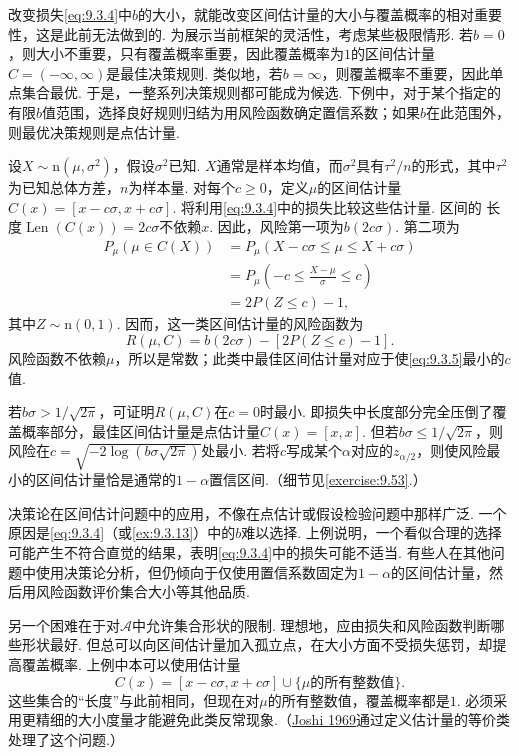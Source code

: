 改变损失\eqref{eq:9.3.4}中$b$的大小，就能改变区间估计量的大小与覆盖概率的相对重要性，这是此前无法做到的. 为展示当前框架的灵活性，考虑某些极限情形. 若$b=0$，则大小不重要，只有覆盖概率重要，因此覆盖概率为$1$的区间估计量$C=(-\infty,\infty)$是最佳决策规则. 类似地，若$b=\infty$，则覆盖概率不重要，因此单点集合最优. 于是，一整系列决策规则都可能成为候选. 下例中，对于某个指定的有限$b$值范围，选择良好规则归结为用风险函数确定置信系数；如果$b$在此范围外，则最优决策规则是点估计量.
\begin{example}[正态区间估计量]\label{ex:9.3.13}
设$X\sim\mathrm n(\mu,\sigma^2)$，假设$\sigma^2$已知. $X$通常是样本均值，而$\sigma^2$具有$\tau^2/n$的形式，其中$\tau^2$为已知总体方差，$n$为样本量. 对每个$c\ge0$，定义$\mu$的区间估计量$C(x)=[x-c\sigma,x+c\sigma]$. 将利用\eqref{eq:9.3.4}中的损失比较这些估计量. 区间的
长度$\operatorname{Len}(C(x))=2c\sigma$不依赖$x$. 因此，风险第一项为$b(2c\sigma)$. 第二项为
$$\begin{aligned}
P_\mu(\mu\in C(X))&=P_\mu(X-c\sigma\le\mu\le X+c\sigma)\\
&=P_\mu\left(-c\le\frac{X-\mu}\sigma\le c\right)\\
&=2P(Z\le c)-1,
\end{aligned}$$
其中$Z\sim\mathrm n(0,1)$. 因而，这一类区间估计量的风险函数为
\begin{equation}\label{eq:9.3.5}
R(\mu,C)=b(2c\sigma)-[2P(Z\le c)-1].
\end{equation}
风险函数不依赖$\mu$，所以是常数；此类中最佳区间估计量对应于使\eqref{eq:9.3.5}最小的$c$值.

若$b\sigma>1/\sqrt{2\pi}$，可证明$R(\mu,C)$在$c=0$时最小. 即损失中长度部分完全压倒了覆盖概率部分，最佳区间估计量是点估计量$C(x)=[x,x]$. 但若$b\sigma\le1/\sqrt{2\pi}$，则风险在$c=\sqrt{-2\log(b\sigma\sqrt{2\pi})}$处最小. 若将$c$写成某个$\alpha$对应的$z_{\alpha/2}$，则使风险最小的区间估计量恰是通常的$1-\alpha$置信区间.（细节见\autoref{exercise:9.53}.）
\end{example}
决策论在区间估计问题中的应用，不像在点估计或假设检验问题中那样广泛. 一个原因是\eqref{eq:9.3.4}（或\autoref{ex:9.3.13}）中的$b$难以选择. 上例说明，一个看似合理的选择可能产生不符合直觉的结果，表明\eqref{eq:9.3.4}中的损失可能不适当. 有些人在其他问题中使用决策论分析，但仍倾向于仅使用置信系数固定为$1-\alpha$的区间估计量，然后用风险函数评价集合大小等其他品质.

另一个困难在于对$\mathcal A$中允许集合形状的限制. 理想地，应由损失和风险函数判断哪些形状最好. 但总可以向区间估计量加入孤立点，在大小方面不受损失惩罚，却提高覆盖概率. 上例中本可以使用估计量
$$C(x)=[x-c\sigma,x+c\sigma]\cup\{\mu\text{的所有整数值}\}.$$
这些集合的“长度”与此前相同，但现在对$\mu$的所有整数值，覆盖概率都是$1$. 必须采用更精细的大小度量才能避免此类反常现象.（\hyperref[bib:source183]{Joshi 1969}通过定义估计量的等价类处理了这个问题.）

